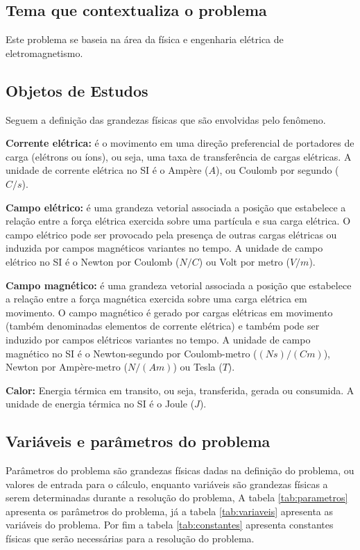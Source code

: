 \documentclass[
	article,			%
	11pt,				%
	oneside,			%
	a4paper,			%
	english,			%
	brazil,				%
	sumario=tradicional
	]{abntex2}
\begin{document}
\subsection{Tema que contextualiza o problema}

Este problema se baseia na área da física e engenharia elétrica de eletromagnetismo.

\subsection{Objetos de Estudos}

Seguem a definição das grandezas físicas que são envolvidas pelo fenômeno.

\textbf{Corrente elétrica:} é o movimento em uma direção preferencial de portadores de carga (elétrons ou íons), ou seja, uma taxa de transferência de cargas elétricas. A unidade de corrente elétrica no SI é o Ampère ($ A $), ou Coulomb por segundo ($ C/s $). \cite{keller:1998}

\textbf{Campo elétrico:} é uma grandeza vetorial associada a posição que estabelece a relação entre a força elétrica exercida sobre uma partícula e sua carga elétrica. O campo elétrico pode ser provocado pela presença de outras cargas elétricas ou induzida por campos magnéticos variantes no tempo. A unidade de campo elétrico no SI é o Newton por Coulomb ($ N/C $) ou Volt por metro ($ V/m $). \cite{keller:1998}

\textbf{Campo magnético:} é uma grandeza vetorial associada a posição que estabelece a relação entre a força magnética exercida sobre uma carga elétrica em movimento. O campo magnético é gerado por cargas elétricas em movimento (também denominadas elementos de corrente elétrica) e também pode ser induzido por campos elétricos variantes no tempo. A unidade de campo magnético no SI é o Newton-segundo por Coulomb-metro ($ (Ns)/(Cm) $), Newton por Ampère-metro ($ N/(Am) $) ou Tesla ($ T $). \cite{keller:1998}

\textbf{Calor:} Energia térmica em transito, ou seja, transferida, gerada ou consumida. A unidade de energia térmica no SI é o Joule ($ J $).

\subsection{Variáveis e parâmetros do problema}

Parâmetros do problema são grandezas físicas dadas na definição do problema, ou valores de entrada para o cálculo, enquanto variáveis são grandezas físicas a serem determinadas durante a resolução do problema, A tabela \ref{tab:parametros} apresenta os parâmetros do problema, já a tabela \ref{tab:variaveis} apresenta as variáveis do problema. Por fim a tabela \ref{tab:constantes} apresenta constantes físicas que serão necessárias para a resolução do problema.
\end{document}
